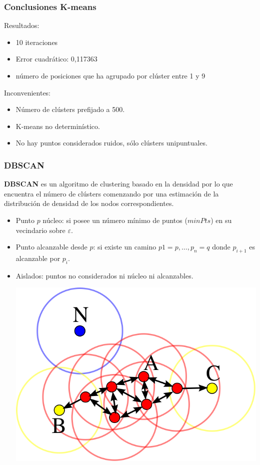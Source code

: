 \documentclass[10pt, spanish]{beamer}
\begin{document}
\begin{frame}[fragile]
\frametitle{Conclusiones K-means}

Resultados:
\begin{itemize}
\item 10 iteraciones 
\item Error cuadr\'atico: 0,117363
\item n\'umero de posiciones que ha agrupado por cl\'uster entre 1 y 9
\end{itemize}

\bigskip

Inconvenientes:
\begin{itemize}
	\item N\'umero de cl\'usters prefijado a 500.
	\item K-means no determin\'istico.
	\item No hay puntos considerados ruidos, s\'olo cl\'usters unipuntuales.
\end{itemize}
\end{frame}



\begin{frame}[fragile]
\frametitle{DBSCAN}
\textbf{DBSCAN}  es un algoritmo de clustering basado en la densidad por lo que encuentra el n\'umero de cl\'usters comenzando por una estimación de la distribución
de densidad de los nodos correspondientes. \\

\begin{itemize}
\item Punto $p$ n\'ucleo: si posee un n\'umero m\'inimo de puntos ($minPts$) en su vecindario sobre $\varepsilon$.
\item Punto alcanzable desde $p$: si existe un camino $p1=p, \ldots, p_n=q$ donde $p_{i+1}$ es alcanzable por $p_i$.
\item Aislados: puntos no considerados ni n\'ucleo ni alcanzables.

\smallskip
	\centering
	\includegraphics[scale=.2]{DBSCAN.png}
\end{itemize}
\end{frame}
\end{document}
